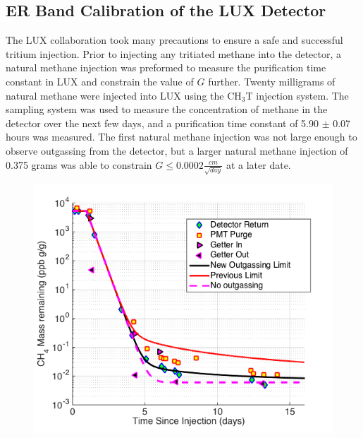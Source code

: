 \documentclass[a4paper,12pt]{article}
\begin{document}
{\subsection{ER Band Calibration of the LUX Detector} 

The LUX collaboration took many precautions to ensure a safe and successful tritium injection. Prior to injecting any tritiated methane into the detector, a natural methane injection was preformed to measure the purification time constant in LUX and constrain the value of $G$ further.   Twenty milligrams of natural methane were injected into LUX using the CH$_3$T injection system. The sampling system was used to measure the concentration of methane in the detector over the next few days, and a purification time constant of 5.90 $\pm$ 0.07 hours was measured.  The first natural methane injection was not large enough to observe outgassing from the detector, but a larger natural methane injection of 0.375 grams was able to constrain $G \le 0.0002 \frac{cm}{\sqrt{day}}$ at a later date.


\begin{figure} [!h]
\includegraphics[scale=.7]{LUXOutgassing.png} 
\label{LuxOutgassing}
\end{figure}

}
\end{document}
